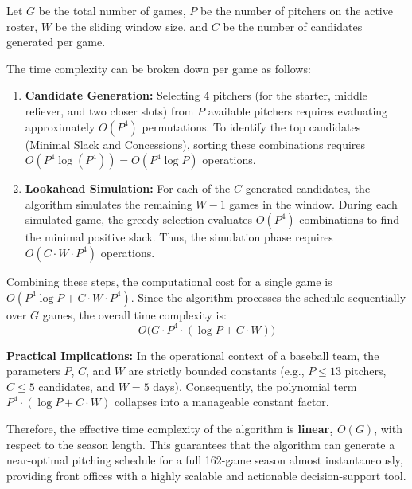 \documentclass[11pt, a4paper]{article}
\begin{document}
Let $G$ be the total number of games, $P$ be the number of pitchers on the active roster, $W$ be the sliding window size, and $C$ be the number of candidates generated per game.

The time complexity can be broken down per game as follows:
\begin{enumerate}
    \item \textbf{Candidate Generation:} Selecting 4 pitchers (for the starter, middle reliever, and two closer slots) from $P$ available pitchers requires evaluating approximately $O(P^4)$ permutations. To identify the top candidates (Minimal Slack and Concessions), sorting these combinations requires $O(P^4 \log(P^4)) = O(P^4 \log P)$ operations.
    \item \textbf{Lookahead Simulation:} For each of the $C$ generated candidates, the algorithm simulates the remaining $W-1$ games in the window.
    During each simulated game, the greedy selection evaluates $O(P^4)$ combinations to find the minimal positive slack.
    Thus, the simulation phase requires $O(C \cdot W \cdot P^4)$ operations.
\end{enumerate}

Combining these steps, the computational cost for a single game is $O(P^4 \log P + C \cdot W \cdot P^4)$.
Since the algorithm processes the schedule sequentially over $G$ games, the overall time complexity is:
\begin{equation}
    O\Big(G \cdot P^4 \cdot (\log P + C \cdot W)\Big)
\end{equation}

\textbf{Practical Implications:} In the operational context of a baseball team, the parameters $P$, $C$, and $W$ are strictly bounded constants (e.g., $P \le 13$ pitchers, $C \le 5$ candidates, and $W = 5$ days).
Consequently, the polynomial term $P^4 \cdot (\log P + C \cdot W)$ collapses into a manageable constant factor.

Therefore, the effective time complexity of the algorithm is \textbf{linear, $O(G)$}, with respect to the season length.
This guarantees that the algorithm can generate a near-optimal pitching schedule for a full 162-game season almost instantaneously, providing front offices with a highly scalable and actionable decision-support tool.
\end{document}
